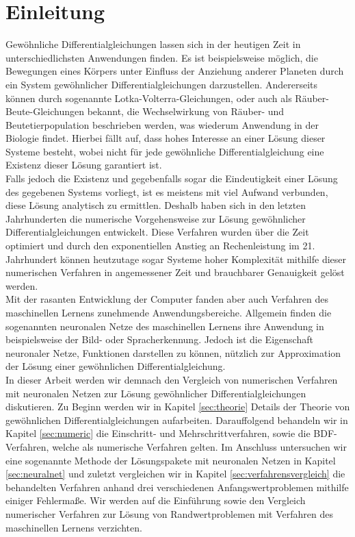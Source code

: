 \section{Einleitung}
\label{sec:einleitung}
Gewöhnliche Differentialgleichungen lassen sich in der heutigen Zeit in unterschiedlichsten Anwendungen finden.
Es ist beispielsweise möglich, die Bewegungen eines Körpers unter Einfluss der Anziehung anderer Planeten durch
ein System gewöhnlicher Differentialgleichungen darzustellen. Andererseits können durch sogenannte
Lotka-Volterra-Gleichungen, oder auch als Räuber-Beute-Gleichungen bekannt, die Wechselwirkung von Räuber- und
Beutetierpopulation beschrieben werden, was wiederum Anwendung in der Biologie findet. Hierbei fällt auf, dass hohes
Interesse an einer Lösung dieser Systeme besteht, wobei nicht für jede gewöhnliche Differentialgleichung eine Existenz
dieser Lösung garantiert ist.\\
Falls jedoch die Existenz und gegebenfalls sogar die Eindeutigkeit einer Lösung des gegebenen Systems vorliegt, ist es
meistens mit viel Aufwand verbunden, diese Lösung analytisch zu ermittlen. Deshalb haben sich in den letzten
Jahrhunderten die numerische Vorgehensweise zur Lösung gewöhnlicher Differentialgleichungen entwickelt.
Diese Verfahren wurden über die Zeit optimiert und durch den exponentiellen Anstieg an Rechenleistung im 21. Jahrhundert
können heutzutage sogar Systeme hoher Komplexität mithilfe dieser numerischen Verfahren in angemessener Zeit und
brauchbarer Genauigkeit gelöst werden. \\
Mit der rasanten Entwicklung der Computer fanden aber auch Verfahren des maschinellen Lernens zunehmende
Anwendungsbereiche. Allgemein finden die sogenannten neuronalen Netze des maschinellen Lernens ihre Anwendung in
beispielsweise der Bild- oder Spracherkennung. Jedoch ist die Eigenschaft neuronaler Netze, Funktionen darstellen zu
können, nützlich zur Approximation der Lösung einer gewöhnlichen Differentialgleichung. \\
In dieser Arbeit werden wir demnach den Vergleich von numerischen Verfahren mit neuronalen Netzen zur Lösung
gewöhnlicher Differentialgleichungen diskutieren. Zu Beginn werden wir in Kapitel \ref{sec:theorie} Details der
Theorie von gewöhnlichen Differentialgleichungen aufarbeiten. Darauffolgend behandeln wir in Kapitel \ref{sec:numeric}
die Einschritt- und Mehrschrittverfahren, sowie die BDF-Verfahren, welche als numerische Verfahren gelten.
Im Anschluss untersuchen wir eine sogenannte Methode der Lösungspakete mit neuronalen Netzen in
Kapitel \ref{sec:neuralnet} und zuletzt vergleichen wir in Kapitel \ref{sec:verfahrensvergleich} die behandelten
Verfahren anhand drei verschiedenen Anfangswertproblemen mithilfe einiger Fehlermaße. Wir werden auf die Einführung
sowie den Vergleich numerischer Verfahren zur Lösung von Randwertproblemen mit Verfahren des maschinellen Lernens
verzichten.
\newpage

